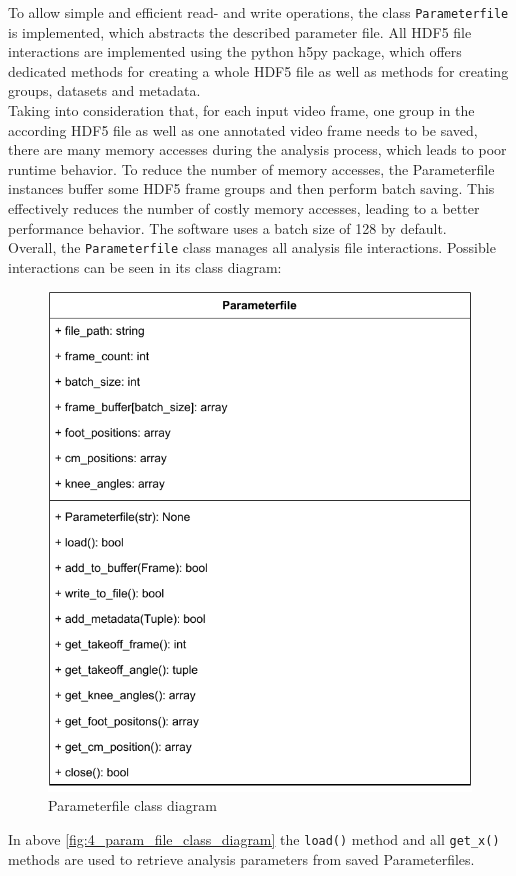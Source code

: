 \noindent To allow simple and efficient read- and write operations, the class
\texttt{Parameterfile} is implemented, which abstracts the described parameter
file.
All HDF5 file interactions are implemented using the python
h5py package\cite*{collette_python_hdf5_2014}, which offers dedicated methods
for creating a whole HDF5 file as well as methods for creating groups,
datasets and metadata.\\
Taking into consideration that, for each input video frame, one group in the
according HDF5 file as well as one annotated video frame needs to be saved,
there are many memory accesses during the analysis process, which leads to
poor runtime behavior.
To reduce the number of memory accesses, the Parameterfile instances buffer
some HDF5 frame groups and then perform batch saving.
This effectively reduces the number of costly memory accesses, leading to
a better performance behavior.
The software uses a batch size of 128 by default.\\
Overall, the \texttt{Parameterfile} class manages all analysis file
interactions.
Possible interactions can be seen in its class diagram:
\begin{figure}[!h]
    \centering
    \includegraphics[scale=0.6]{Parameterfile.pdf}
    \caption[Parameterfile class diagram]{Parameterfile class diagram}
    \label{fig:4_param_file_class_diagram}
\end{figure}
\FloatBarrier
\noindent In above \autoref{fig:4_param_file_class_diagram} the
\texttt{load()} method and all \texttt{get\_x()} methods are used to retrieve
analysis parameters from saved Parameterfiles.


